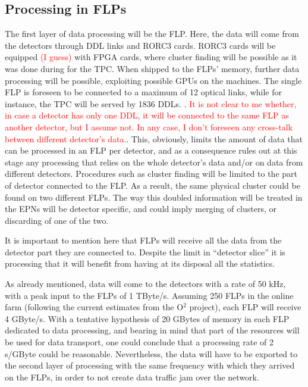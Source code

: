 \subsection{Processing in FLPs}
\label{sec:Processing in FLPs}
The first layer of data processing will be the FLP. Here, the data will come from the detectors through DDL links and 
RORC3 cards. RORC3 cards will be equipped \textcolor{red}{(I guess)} with FPGA cards, where cluster finding will be 
possible as it was done during  for the TPC. When shipped to the FLPs' memory, further data processing will 
be possible, exploiting possible GPUs on 
the machines. The single FLP is foreseen to be connected to a maximum
of 12 optical links, while for instance, the TPC will be served by
1836 DDLs.
. \textcolor{red}{It is not
clear to me whether, in case a detector has only one DDL, it will be connected to the same FLP as another detector, but
I assume not. In any case, I don't foreseen any cross-talk between
different detector's data.}. 
This, obviously, limits the amount of 
data that can be processed in an FLP per detector, and as a consequence rules out at this stage any processing that
relies on the whole detector's data and/or on data from different detectors. Procedures such as cluster finding will 
be limited to the part of detector connected to the FLP. As a result, the same physical cluster could be found on two 
different FLPs. The way this doubled information will be treated in the EPNs will be detector specific, and could imply
merging of clusters, or discarding of one of the two. 

It is important to mention here that FLPs will receive all the data from the detector part they are connected to. Despite the
limit in ``detector slice'' it is processing that it
will 
benefit from having at its disposal all the statistics. 

As already mentioned, data will come to the detectors with a rate of 50 kHz, with a peak input to the FLPs of 1 TByte/s. 
Assuming 250 FLPs in the online farm (following the current estimates from the O$^2$ project), each FLP will receive
4 GByte/s. With a tentative hypothesis of 20 GBytes of memory in each FLP dedicated to data processing, and bearing in 
mind that part of the resources will be used for data transport, one could conclude that a processing rate of 2 s/GByte
could be reasonable. Nevertheless, the data will have to be exported to the second layer of processing with the same 
frequency with which they arrived on the FLPs, in order to not create data traffic jam over the network. 

